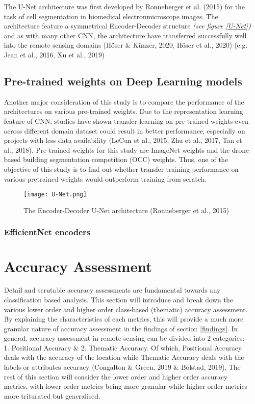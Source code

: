 \documentclass[11pt, a4paper, twoside]{report}
\begin{document}
The U-Net architecture was first developed by Ronneberger et al. (2015) for the task of cell segmentation in biomedical electronmicroscope images. The architecture feature a symmetrical Encoder-Decoder structure \textit{(see figure \ref{U-Net})} and as with many other CNN, the architecture have transferred successfully well into the remote sensing domains (Höser \& Künzer, 2020, Höser et al., 2020) (e.g. Jean et al., 2016, Xu et al., 2019)

\subsection{Pre-trained weights on Deep Learning models}

Another major consideration of this study is to compare the performance of the architectures on various pre-trained weights. Due to the representation learning feature of CNN, studies have shown transfer learning on pre-trained weights even across different domain dataset could result in better performance, especially on projects with less data availability (LeCun et al., 2015, Zhu et al., 2017, Tan et al., 2018). Pre-trained weights for this study are ImageNet weights and the drone-based building segmentation competition (OCC) weights. Thus, one of the objective of this study is to find out whether transfer training performance on various pretrained weights would outperform training from scratch.

\begin{figure}[h]
  \centering
  \texttt{[image: U-Net.png]}
  \caption{The Encoder-Decoder U-Net architecture (Ronneberger et al., 2015)}
  \label{fig:U-Net}
\end{figure}


\subsubsection{EfficientNet encoders}

\section{Accuracy Assessment}\label{AccAss}

Detail and scrutable accuracy assessments are fundamental towards any classification based analysis. This section will introduce and break down the various lower order and higher order class-based (thematic) accuracy assessment. By explaining the characteristics of each metrics, this will provide a much more granular nature of accuracy assessment in the findings of section \ref{findings}. In general, accuracy assessment in remote sensing can be divided into 2 categories: 1. Positional Accuracy \& 2. Thematic Accuracy. Of which, Positional Accuracy deals with the accuracy of the location while Thematic Accuracy deals with the labels or attributes accuracy (Congalton \& Green, 2019 \& Bolstad, 2019). The rest of this section will consider the lower order and higher order accuracy metrics, with lower order metrics being more granular while higher order metrics more triturated but generalised.\\\par
\end{document}
